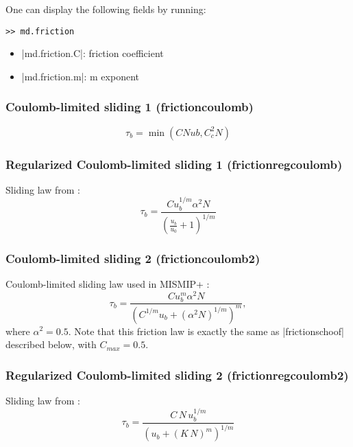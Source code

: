One can display the following fields by running:
\begin{lstlisting}
>> md.friction
\end{lstlisting}
\begin{itemize}
	\item \lstinlinebg|md.friction.C|: friction coefficient
	\item \lstinlinebg|md.friction.m|: m exponent
\end{itemize}

\subsubsection{Coulomb-limited sliding 1 (frictioncoulomb)}
\begin{equation}
	\tau_b = \min\left(C N ub , C_c^2 N \right) 
\end{equation}

\subsubsection{Regularized Coulomb-limited sliding 1 (frictionregcoulomb)}
Sliding law from \cite{Joughin2019}:
\begin{equation}
	\tau_b = \frac{C u_b^{1/m}\alpha^2 N}{\left(\frac{u_b}{u_0} + 1\right)^{1/m}}
\end{equation}

\subsubsection{Coulomb-limited sliding 2 (frictioncoulomb2)}
Coulomb-limited sliding law used in MISMIP+ \citep{Cornford2020}:
\begin{equation}
	\tau_b = \frac{C u_b^{m}\alpha^2 N}{\left(C^{1/m}u_b + (\alpha^2N)^{1/m}\right)^{m}},
\end{equation}
where $\alpha^2 = 0.5$. Note that this friction law is exactly the same as \lstinlinebg|frictionschoof| described below, with $C_{max} = 0.5$.

\subsubsection{Regularized Coulomb-limited sliding 2 (frictionregcoulomb2)}
Sliding law from \cite{Helanow2021}:
\begin{equation}
	\tau_b = \frac{C\, N\, u_b^{1/m}}{\left(u_b + (K\,N)^{m}\right)^{1/m}}
\end{equation}

